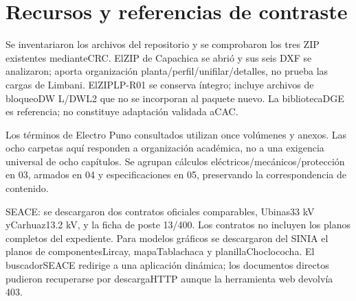\setcounter{section}{8}
\section{Recursos y referencias de contraste}
Se inventariaron los archivos del repositorio y se comprobaron los tres ZIP existentes medianteCRC. ElZIP de Capachica se abrió y sus seis DXF se analizaron; aporta organización planta/perfil/unifilar/detalles, no prueba las cargas de Limbani. ElZIPLP-R01 se conserva íntegro; incluye archivos de bloqueoDW L/DWL2 que no se incorporan al paquete nuevo. La bibliotecaDGE es referencia; no constituye adaptación validada aCAC.

Los términos de Electro Puno consultados utilizan once volúmenes y anexos. Las ocho carpetas aquí responden a organización académica, no a una exigencia universal de ocho capítulos. Se agrupan cálculos eléctricos/mecánicos/protección en 03, armados en 04 y especificaciones en 05, preservando la correspondencia de contenido.

SEACE: se descargaron dos contratos oficiales comparables, Ubinas33 kV yCarhuaz13.2 kV, y la ficha de poste 13/400. Los contratos no incluyen los planos completos del expediente. Para modelos gráficos se descargaron del SINIA el planos de componentesLircay, mapaTablachaca y planillaChoclococha. El buscadorSEACE redirige a una aplicación dinámica; los documentos directos pudieron recuperarse por descargaHTTP aunque la herramienta web devolvía 403.

